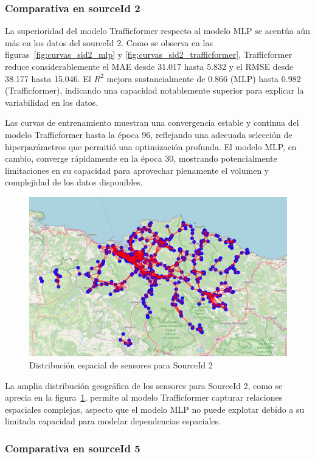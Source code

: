 \subsubsection*{Comparativa en sourceId 2}

La superioridad del modelo Trafficformer respecto al modelo MLP se acentúa aún más en los datos del sourceId 2. Como se observa en las figuras~\ref{fig:curvas_sid2_mlp} y \ref{fig:curvas_sid2_trafficformer}, Trafficformer reduce considerablemente el MAE desde 31.017 hasta 5.832 y el RMSE desde 38.177 hasta 15.046. El $R^2$ mejora sustancialmente de 0.866 (MLP) hasta 0.982 (Trafficformer), indicando una capacidad notablemente superior para explicar la variabilidad en los datos.

Las curvas de entrenamiento muestran una convergencia estable y continua del modelo Trafficformer hasta la época 96, reflejando una adecuada selección de hiperparámetros que permitió una optimización profunda. El modelo MLP, en cambio, converge rápidamente en la época 30, mostrando potencialmente limitaciones en su capacidad para aprovechar plenamente el volumen y complejidad de los datos disponibles.

\begin{figure}[H]
	\centering
	\includegraphics[width=0.7\linewidth]{includes/cap5/source_id_2_meters_mask.png}
	\caption{Distribución espacial de sensores para SourceId 2}
	\label{fig:sensores_sid2}
\end{figure}

La amplia distribución geográfica de los sensores para SourceId 2, como se aprecia en la figura~\ref{fig:sensores_sid2}, permite al modelo Trafficformer capturar relaciones espaciales complejas, aspecto que el modelo MLP no puede explotar debido a su limitada capacidad para modelar dependencias espaciales.

\subsubsection*{Comparativa en sourceId 5}

